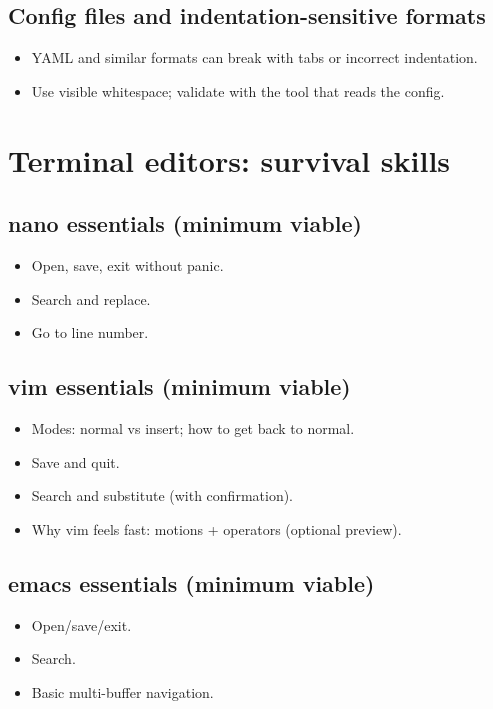 \subsection{Config files and indentation-sensitive formats}
\begin{itemize}
\item YAML and similar formats can break with tabs or incorrect indentation.
\item Use visible whitespace; validate with the tool that reads the config.
\end{itemize}

\section{Terminal editors: survival skills}
\subsection{nano essentials (minimum viable)}
\begin{itemize}
\item Open, save, exit without panic.
\item Search and replace.
\item Go to line number.
\end{itemize}

\subsection{vim essentials (minimum viable)}
\begin{itemize}
\item Modes: normal vs insert; how to get back to normal.
\item Save and quit.
\item Search and substitute (with confirmation).
\item Why vim feels fast: motions + operators (optional preview).
\end{itemize}

\subsection{emacs essentials (minimum viable)}
\begin{itemize}
\item Open/save/exit.
\item Search.
\item Basic multi-buffer navigation.
\end{itemize}

